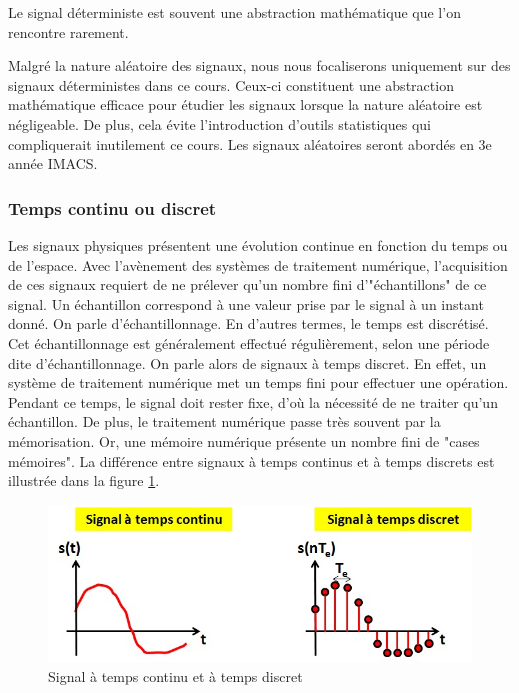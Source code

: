 	Le signal déterministe est souvent une abstraction mathématique que l'on rencontre rarement. 
	
	Malgré la nature aléatoire des signaux, nous nous focaliserons uniquement sur des signaux déterministes dans ce cours. Ceux-ci constituent une abstraction mathématique efficace pour étudier les signaux lorsque la nature aléatoire est négligeable. De plus, cela évite l'introduction d'outils statistiques qui compliquerait inutilement ce cours. Les signaux aléatoires seront abordés en 3e année IMACS.


	\subsubsection{Temps continu ou discret}
	Les signaux physiques présentent une évolution continue en fonction du temps ou de l'espace. Avec l'avènement des systèmes de traitement numérique, l'acquisition de ces signaux requiert de ne prélever qu'un nombre fini d'"échantillons" de ce signal. Un échantillon correspond à une valeur prise par le signal à un instant donné. On parle d'échantillonnage. En d'autres termes, le temps est discrétisé. Cet échantillonnage est généralement effectué régulièrement, selon une période dite d'échantillonnage.
	On parle alors de signaux à temps discret. En effet, un système de traitement numérique met un temps fini pour effectuer une opération. Pendant ce temps, le signal doit rester fixe, d'où la nécessité de ne traiter qu'un échantillon. De plus, le traitement numérique passe très souvent par la mémorisation. Or, une mémoire numérique présente un nombre fini de "cases mémoires". La différence entre signaux à temps continus et à temps discrets est illustrée dans la figure \ref{Fig:Signal_tps_continu_discret}.
	
	\begin{figure}[h!]
		\centering
		\includegraphics[scale=0.5]{images/Signal_tps_continu_discret.jpg} 
		\caption{Signal à temps continu et à temps discret}	
		\label{Fig:Signal_tps_continu_discret}
	\end{figure}
	
